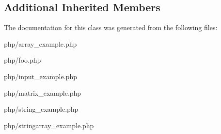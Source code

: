 \subsection*{Additional Inherited Members}


The documentation for this class was generated from the following files\-:\begin{DoxyCompactItemize}
\item 
php/array\-\_\-example.\-php\item 
php/foo.\-php\item 
php/input\-\_\-example.\-php\item 
php/matrix\-\_\-example.\-php\item 
php/string\-\_\-example.\-php\item 
php/stringarray\-\_\-example.\-php\end{DoxyCompactItemize}
